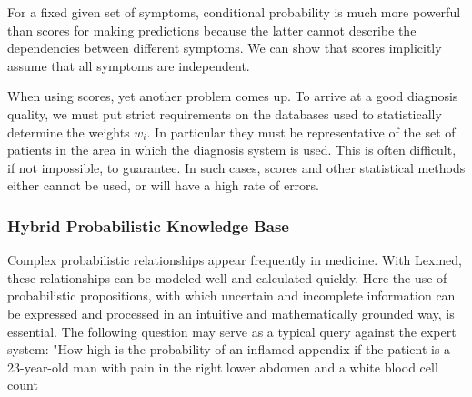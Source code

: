 \documentclass[10pt]{book}
\begin{document}
For a fixed given set of symptoms, conditional probability is much more powerful than scores for making predictions because the latter cannot describe the dependencies between different symptoms. We can show that scores implicitly assume that all symptoms are independent.

When using scores, yet another problem comes up. To arrive at a good diagnosis quality, we must put strict requirements on the databases used to statistically determine the weights $w_{i}$. In particular they must be representative of the set of patients in the area in which the diagnosis system is used. This is often difficult, if not impossible, to guarantee. In such cases, scores and other statistical methods either cannot be used, or will have a high rate of errors.

\subsubsection*{Hybrid Probabilistic Knowledge Base}
Complex probabilistic relationships appear frequently in medicine. With Lexmed, these relationships can be modeled well and calculated quickly. Here the use of probabilistic propositions, with which uncertain and incomplete information can be expressed and processed in an intuitive and mathematically grounded way, is essential. The following question may serve as a typical query against the expert system: "How high is the probability of an inflamed appendix if the patient is a 23-year-old man with pain in the right lower abdomen and a white blood cell count
\end{document}
